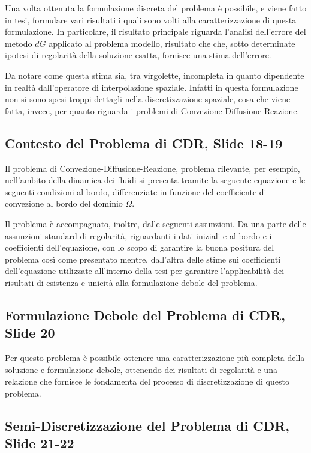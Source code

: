 \documentclass[12pt]{article}
\begin{document}
    Una volta ottenuta la formulazione discreta del problema è possibile, e viene fatto in tesi, formulare vari risultati i quali sono volti alla caratterizzazione di questa formulazione. In particolare, il risultato principale riguarda l'analisi dell'errore del metodo $dG$ applicato al problema modello, risultato che che, sotto determinate ipotesi di regolarità della soluzione esatta, fornisce una stima dell'errore.

    Da notare come questa stima sia, tra virgolette, incompleta in quanto dipendente in realtà dall'operatore di interpolazione spaziale. Infatti in questa formulazione non si sono spesi troppi dettagli nella discretizzazione spaziale, cosa che viene fatta, invece, per quanto riguarda i problemi di Convezione-Diffusione-Reazione.

    \newpage
    \subsection{Contesto del Problema di CDR, Slide 18-19}

    Il problema di Convezione-Diffusione-Reazione, problema rilevante, per esempio, nell'ambito della dinamica dei fluidi si presenta tramite la seguente equazione e le seguenti condizioni al bordo, differenziate in funzione del coefficiente di convezione al bordo del dominio $\Omega$.

    Il problema è accompagnato, inoltre, dalle seguenti assunzioni. Da una parte delle assunzioni standard di regolarità, riguardanti i dati iniziali e al bordo e i coefficienti dell'equazione, con lo scopo di garantire la buona positura del problema così come presentato mentre, dall'altra delle stime sui coefficienti dell'equazione utilizzate all'interno della tesi per garantire l'applicabilità dei risultati di esistenza e unicità alla formulazione debole del problema.

    \subsection{Formulazione Debole del Problema di CDR, Slide 20}

    Per questo problema è possibile ottenere una caratterizzazione più completa della soluzione e formulazione debole, ottenendo dei risultati di regolarità e una relazione che fornisce le fondamenta del processo di discretizzazione di questo problema.

    \subsection{Semi-Discretizzazione del Problema di CDR, Slide 21-22}
\end{document}
